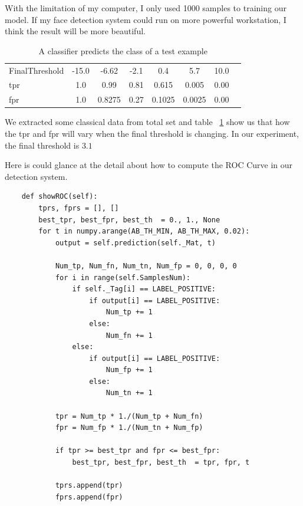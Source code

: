 \documentclass[a4paper, 11pt]{article} %
\begin{document}
    With the limitation of my computer, I only used 1000 samples to training our model. If my face detection system could run on more powerful workstation, I think the result will be more beautiful.

    \begin{table}[H]
        \centering
        \caption{A classifier predicts the class of a test example}
        \begin{tabular}{l c c c c c c c}
        \hline
        \hline
        FinalThreshold  & -15.0 & -6.62     & -2.1  & 0.4       & 5.7       & 10.0\\
        tpr             & 1.0   & 0.99      & 0.81  & 0.615     & 0.005     & 0.00\\
        fpr             & 1.0   & 0.8275    & 0.27  & 0.1025    & 0.0025    & 0.00\\
        \hline
        \end{tabular}
        \label{table:selectThreshold}
    \end{table}

    We extracted some classical data from total set and table ~\ref{table:selectThreshold} show us that how the tpr and fpr will vary when the final threshold is changing. In our experiment, the final threshold is $3.1$

    \clearpage
    Here is could glance at the detail about how to compute the ROC Curve in our detection system.
    \begin{verbatim}
    def showROC(self):
        tprs, fprs = [], []
        best_tpr, best_fpr, best_th  = 0., 1., None
        for t in numpy.arange(AB_TH_MIN, AB_TH_MAX, 0.02):
            output = self.prediction(self._Mat, t)

            Num_tp, Num_fn, Num_tn, Num_fp = 0, 0, 0, 0
            for i in range(self.SamplesNum):
                if self._Tag[i] == LABEL_POSITIVE:
                    if output[i] == LABEL_POSITIVE:
                        Num_tp += 1
                    else:
                        Num_fn += 1
                else:
                    if output[i] == LABEL_POSITIVE:
                        Num_fp += 1
                    else:
                        Num_tn += 1

            tpr = Num_tp * 1./(Num_tp + Num_fn)
            fpr = Num_fp * 1./(Num_tn + Num_fp)

            if tpr >= best_tpr and fpr <= best_fpr:
                best_tpr, best_fpr, best_th  = tpr, fpr, t
                
            tprs.append(tpr)
            fprs.append(fpr)
    \end{verbatim}
\end{document}

